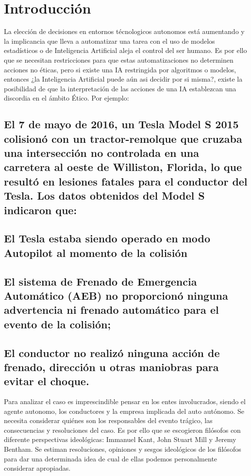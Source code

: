 \section{Introducción}
La elección de decisiones en entornos técnologicos autonomos está aumentando y la implicancia que lleva a automatizar una tarea con el uso de modelos estadísticos o de Inteligencia Artificial aleja el control del ser humano. Es por ello que se necesitan restricciones para que estas automatizaciones no determinen acciones no éticas, pero si existe una IA restringida por algoritmos o modelos, entonces ¿la Inteligencia Artificial puede aún asi decidir por si misma?, existe la posibilidad de que la interpretación de las acciones de una IA establezcan una discordia en el ámbito Ético. Por ejemplo:

\subsection*{El 7 de mayo de 2016, un Tesla Model S 2015 colisionó con un tractor-remolque que cruzaba una intersección no controlada en una carretera al oeste de Williston, Florida, lo que resultó en lesiones fatales para el conductor del Tesla. Los datos obtenidos del Model S indicaron que:}
\subsection{El Tesla estaba siendo operado en modo Autopilot al momento de la colisión}
\subsection{El sistema de Frenado de Emergencia Automático (AEB) no proporcionó ninguna advertencia ni frenado automático para el evento de la colisión;}
\subsection{El conductor no realizó ninguna acción de frenado, dirección u otras maniobras para evitar el choque.}
Para analizar el caso es imprescindible pensar en los entes involucrados, siendo el agente autonomo, los conductores y la empresa implicada del auto autónomo. Se necesita considerar quiénes son los responsables del evento trágico, las consecuencias y resoluciones del caso. Es por ello que se escogieron filósofos con diferente perspectivas ideológicas: Immanuel Kant, John Stuart Mill y Jeremy Bentham. Se estiman resoluciones, opiniones y sesgos ideológicos de los filósofos para dar una determinada idea de cual de ellas podemos personalmente considerar apropiadas. 
